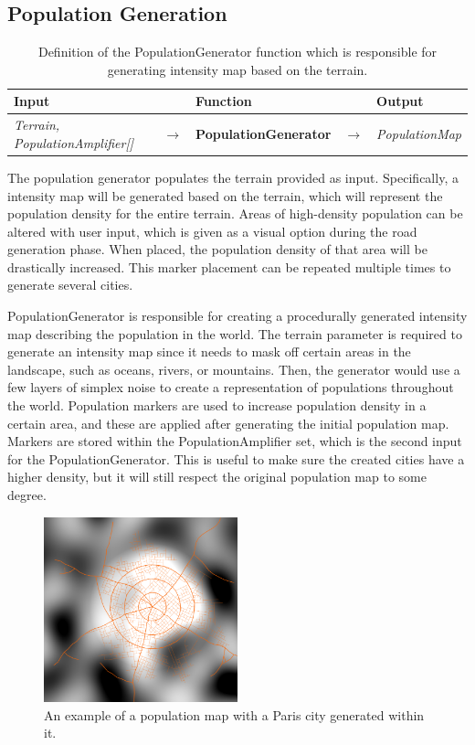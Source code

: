 \subsection{Population Generation}

\begin{table}[H]
  \centering
  \begin{tabular}{lllll}
    \textbf{Input}                           &               & \textbf{Function}            &               & \textbf{Output}         \\
    \midrule
    \textit{Terrain, PopulationAmplifier[]}      & $\rightarrow$ & \textbf{PopulationGenerator}      & $\rightarrow$ & \textit{PopulationMap}        \\
    \bottomrule
  \end{tabular}

  \caption{Definition of the PopulationGenerator function which is responsible for generating intensity map based on the terrain.}
  \label{table:popgen}
\end{table}
\vspace{-0.4cm} %

The population generator populates the terrain provided as input.
Specifically, a intensity map will be generated based on the terrain, which will represent the population density for the entire terrain.
Areas of high-density population can be altered with user input, which is given as a visual option during the road generation phase.
When placed, the population density of that area will be drastically increased.
This marker placement can be repeated multiple times to generate several cities.

PopulationGenerator is responsible for creating a procedurally generated intensity map describing the population in the world.
The terrain parameter is required to generate an intensity map since it needs to mask off certain areas in the landscape, such as oceans, rivers, or mountains.
Then, the generator would use a few layers of simplex noise to create a representation of populations throughout the world.
Population markers are used to increase population density in a certain area, and these are applied after generating the initial population map.
Markers are stored within the PopulationAmplifier set, which is the second input for the PopulationGenerator.
This is useful to make sure the created cities have a higher density, but it will still respect the original population map to some degree.

\begin{figure}[h!]
  \centering
  \includegraphics[width=0.5\textwidth]{figure/pop_density.png}
  \caption{An example of a population map with a Paris city generated within it.}
  \label{fig:pop_dens}
\end{figure}